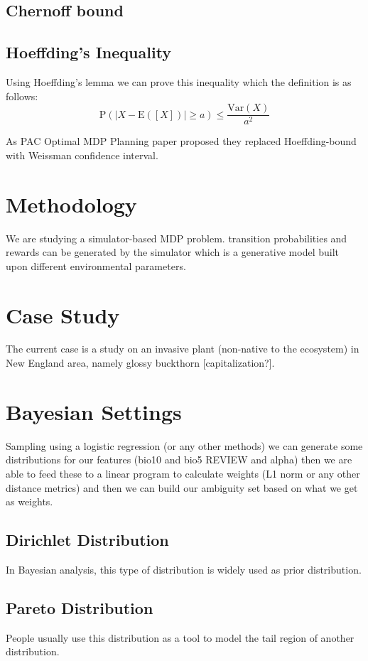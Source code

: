 \documentclass[a4paper,12pt]{article}
\begin{document}
\subsection{Chernoff bound}

\subsection{Hoeffding's Inequality}
Using Hoeffding's lemma we can prove this inequality which the definition is as follows:
\begin{equation}
\mathrm {P}(|X - \mathrm{E}([X])| \geq a ) \leq \frac { \mathrm { Var}( X ) } { a^2 }
\end{equation}

As PAC Optimal MDP Planning paper \autocite{Telghan et al. 2015} proposed they replaced Hoeffding-bound with Weissman confidence interval.
    

\section{Methodology}
We are studying a simulator-based MDP problem. transition probabilities and rewards can be generated by the simulator which is a generative model built upon different environmental parameters.


\section{Case Study}
The current case is a study on an invasive plant (non-native to the ecosystem) in New England area, namely glossy buckthorn [capitalization?].


\section{Bayesian Settings}
Sampling using a logistic regression (or any other methods) we can generate some distributions for our features (bio10 and bio5 REVIEW and alpha) then we are able to feed these to a linear program to calculate weights (L1 norm or any other distance metrics) and then we can build our ambiguity set based on what we get as weights.
\subsection{Dirichlet Distribution}
    In Bayesian analysis, this type of distribution is widely used as prior distribution.
    
\subsection{Pareto Distribution}
    People usually use this distribution as a tool to model the tail region of another distribution.
\end{document}
